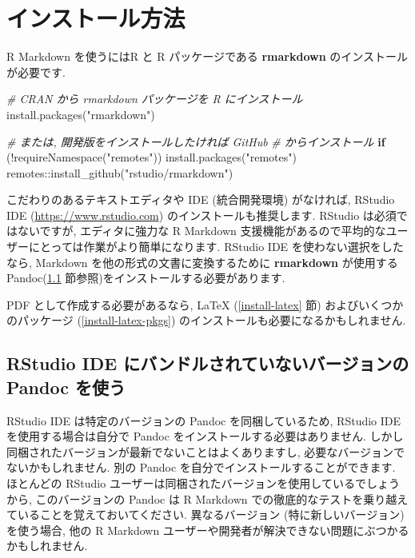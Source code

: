 \documentclass[
  11pt,
  lualatex,
  ja=standard]{bxjsreport}
\newenvironment{Shaded}{\begin{snugshade}}{\end{snugshade}}
\newcommand{\CommentTok}[1]{\textcolor[rgb]{0.56,0.35,0.01}{\textit{#1}}}
\newcommand{\ControlFlowTok}[1]{\textcolor[rgb]{0.13,0.29,0.53}{\textbf{#1}}}
\newcommand{\FunctionTok}[1]{\textcolor[rgb]{0.00,0.00,0.00}{#1}}
\newcommand{\NormalTok}[1]{#1}
\newcommand{\SpecialCharTok}[1]{\textcolor[rgb]{0.00,0.00,0.00}{#1}}
\newcommand{\StringTok}[1]{\textcolor[rgb]{0.31,0.60,0.02}{#1}}
\begin{document}
\mainmatter

\hypertarget{installation}{%
\chapter{インストール方法}\label{installation}}

R Markdown を使うにはR \autocite{R-base} と R パッケージである \textbf{rmarkdown} \autocite{R-rmarkdown} のインストールが必要です.

\begin{Shaded}
\begin{Highlighting}[numbers=left,,]
\CommentTok{\# CRAN から rmarkdown パッケージを R にインストール}
\FunctionTok{install.packages}\NormalTok{(}\StringTok{"rmarkdown"}\NormalTok{)}

\CommentTok{\# または, 開発版をインストールしたければ GitHub}
\CommentTok{\# からインストール}
\ControlFlowTok{if}\NormalTok{ (}\SpecialCharTok{!}\FunctionTok{requireNamespace}\NormalTok{(}\StringTok{"remotes"}\NormalTok{)) }\FunctionTok{install.packages}\NormalTok{(}\StringTok{"remotes"}\NormalTok{)}
\NormalTok{remotes}\SpecialCharTok{::}\FunctionTok{install\_github}\NormalTok{(}\StringTok{"rstudio/rmarkdown"}\NormalTok{)}
\end{Highlighting}
\end{Shaded}

こだわりのあるテキストエディタや IDE (統合開発環境) がなければ, RStudio IDE (\url{https://www.rstudio.com}) のインストールも推奨します. RStudio は必須ではないですが, エディタに強力な R Markdown 支援機能があるので平均的なユーザーにとっては作業がより簡単になります. RStudio IDE を使わない選択をしたなら, Markdown を他の形式の文書に変換するために \textbf{rmarkdown} が使用する Pandoc(\ref{install-pandoc} 節参照)をインストールする必要があります.

PDF として作成する必要があるなら, LaTeX (\ref{install-latex} 節) およびいくつかのパッケージ (\ref{install-latex-pkgs}) のインストールも必要になるかもしれません.

\hypertarget{install-pandoc}{%
\section{RStudio IDE にバンドルされていないバージョンの Pandoc を使う}\label{install-pandoc}}

RStudio IDE は特定のバージョンの Pandoc を同梱しているため, RStudio IDE を使用する場合は自分で Pandoc をインストールする必要はありません. しかし同梱されたバージョンが最新でないことはよくありますし, 必要なバージョンでないかもしれません. 別の Pandoc を自分でインストールすることができます. ほとんどの RStudio ユーザーは同梱されたバージョンを使用しているでしょうから, このバージョンの Pandoc は R Markdown での徹底的なテストを乗り越えていることを覚えておいてください. 異なるバージョン (特に新しいバージョン) を使う場合, 他の R Markdown ユーザーや開発者が解決できない問題にぶつかるかもしれません.
\end{document}
